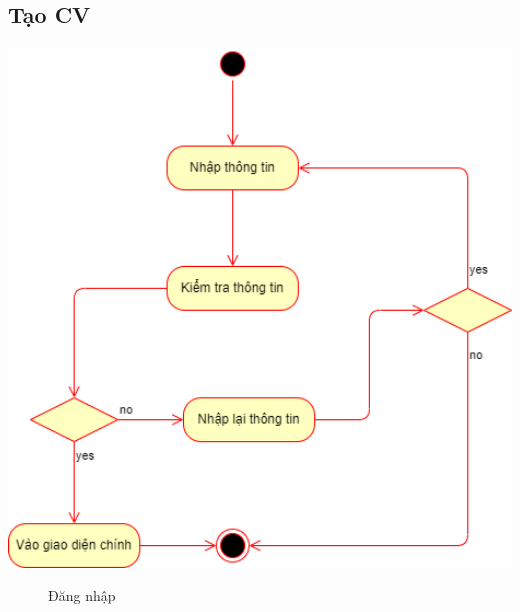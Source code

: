 \subsection{Tạo CV}
  \begin{center}
    \includegraphics[width=1.1\textwidth]{image/activity/login.png}
    \begin{figure}
      \centering
      \caption{Đăng nhập}
    \end{figure}
  \end{center}

